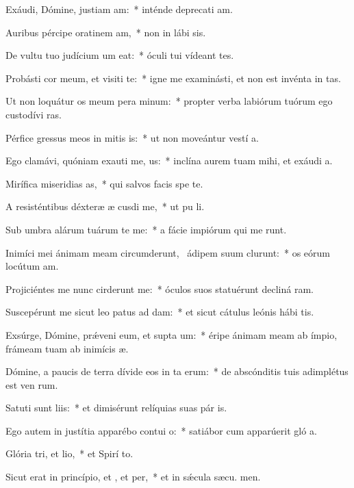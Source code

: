 \item Exáudi, Dómine, justiam am:~* inténde deprecati am.
\item Auribus pércipe oratinem am,~* non in lábi sis.
\item De vultu tuo judícium um eat:~* óculi tui vídeant tes.
\item Probásti cor meum, et visiti te:~* igne me examinásti, et non est invénta in  tas.
\item Ut non loquátur os meum pera minum:~* propter verba labiórum tuórum ego custodívi  ras.
\item Pérfice gressus meos in mitis is:~* ut non moveántur vestí a.
\item Ego clamávi, quóniam exauti me, us:~* inclína aurem tuam mihi, et exáudi  a.
\item Mirífica miseridias as,~* qui salvos facis spe  te.
\item A resisténtibus déxteræ æ cusdi me,~* ut pu li.
\item Sub umbra alárum tuárum te me:~* a fácie impiórum qui me runt.
\item Inimíci mei ánimam meam circumderunt,~\pscross{} ádipem suum clurunt:~* os eórum locútum  am.
\item Projiciéntes me nunc cirderunt me:~* óculos suos statuérunt decliná  ram.
\item Suscepérunt me sicut leo patus ad dam:~* et sicut cátulus leónis hábi  tis.
\item Exsúrge, Dómine, prǽveni eum, et supta um:~* éripe ánimam meam ab ímpio, frámeam tuam ab inimícis  æ.
\item Dómine, a paucis de terra dívide eos in ta erum:~* de abscónditis tuis adimplétus est ven rum.
\item Satuti sunt liis:~* et dimisérunt relíquias suas pár is.
\item Ego autem in justítia apparébo contui o:~* satiábor cum apparúerit gló a.
\item Glória tri, et lio,~* et Spirí to.
\item Sicut erat in princípio, et , et per,~* et in sǽcula sæcu. men.
